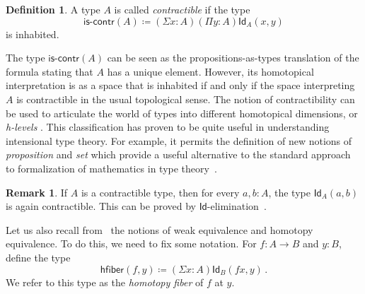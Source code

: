 \documentclass[11pt]{article}
\newcommand{\defeq}{\coloneqq}
\newcommand{\Id}{\mathsf{Id}}
\newcommand{\id}[1]{\Id_{#1}}
\newcommand{\iscontr}{\mathsf{is}\text{-}\mathsf{contr}}
\newcommand{\hfiber}{\mathsf{hfiber}}
\theoremstyle{definition}
\newtheorem{definition}[theorem]{Definition}
\newtheorem{remark}[theorem]{Remark}
\begin{document}
\begin{definition}  A type $A$ is called \emph{contractible} if the  type 
 \begin{equation}
 \label{eq:contractible}
\iscontr(A) \defeq (\Sigma x:A)(\Pi y:A)\id{A}(x,y)
\end{equation}
is inhabited.
\end{definition} 

The type $\iscontr(A)$ can be seen as the propositions-as-types translation
of the formula stating that $A$ has a unique element. However, its homotopical interpretation 
is as a space that is inhabited if and only if the space interpreting $A$ is contractible in the usual
topological sense. The notion of contractibility can be used to articulate the world of types into different homotopical dimensions, or \emph{h-levels} \cite{VoevodskyV:unifc}. This classification has proven to be quite useful in understanding intensional type theory.  
For example, it permits the definition of new notions of \emph{proposition} and \emph{set} which provide a useful alternative to the standard approach to formalization of mathematics in type theory~\cite{VoevodskyV:unifc}.

\begin{remark} \label{thm:idcontrcontr}
If $A$ is a contractible type, then for every $a, b : A$, the type $\id{A}(a,b)$ is again contractible. This can be proved  by $\Id$-elimination~\cite{AwodeyS:indtht}. 
\end{remark}

Let us also recall from~\cite{VoevodskyV:unifc} the notions of weak equivalence and homotopy equivalence. To do this, we need to fix some notation. For $f : A \rightarrow B$
and $y : B$, define the type
\[
 \hfiber(f,y) \defeq (\Sigma x : A) \id{B}(f x, y) \, .
\]
We refer to this type as the \emph{homotopy fiber} of $f$ at $y$. 
\end{document}
